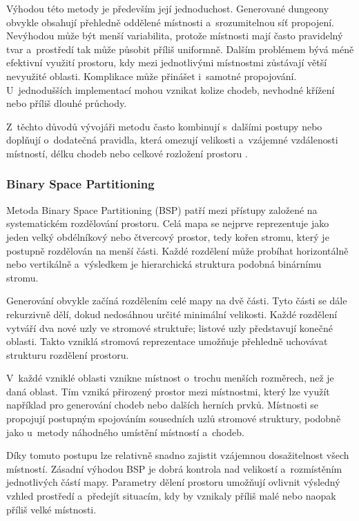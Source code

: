 \documentclass[
   program=itk,
   biblatex,
   figures=true,
   tables=true,
   glossaries,
   index
]{kidiplom}
\begin{document}
Výhodou této metody je především její jednoduchost. Generované dungeony obvykle obsahují přehledně oddělené místnosti a~srozumitelnou síť propojení. Nevýhodou může být menší variabilita, protože místnosti mají často pravidelný tvar a~prostředí tak může působit příliš uniformně. Dalším problémem bývá méně efektivní využití prostoru, kdy mezi jednotlivými místnostmi zůstávají větší nevyužité oblasti. Komplikace může přinášet i~samotné propojování. U~jednodušších implementací mohou vznikat kolize chodeb, nevhodné křížení nebo příliš dlouhé průchody.

Z~těchto důvodů vývojáři metodu často kombinují s~dalšími postupy nebo doplňují o~dodatečná pravidla, která omezují velikosti a~vzájemné vzdálenosti místností, délku chodeb nebo celkové rozložení prostoru \cite{Linden2014,Shaker2016}.

\subsubsection{Binary Space Partitioning}

Metoda Binary Space Partitioning (BSP) patří mezi přístupy založené na systematickém rozdělování prostoru. Celá mapa se nejprve reprezentuje jako jeden velký obdélníkový nebo čtvercový prostor, tedy kořen stromu, který je postupně rozdělován na menší části. Každé rozdělení může probíhat horizontálně nebo vertikálně a~výsledkem je hierarchická struktura podobná binárnímu stromu.

Generování obvykle začíná rozdělením celé mapy na dvě části. Tyto části se dále rekurzivně dělí, dokud nedosáhnou určité minimální velikosti. Každé rozdělení vytváří dva nové uzly ve stromové struktuře; listové uzly představují konečné oblasti. Takto vzniklá stromová reprezentace umožňuje přehledně uchovávat strukturu rozdělení prostoru.

V~každé vzniklé oblasti vznikne místnost o~trochu menších rozměrech, než je daná oblast. Tím vzniká přirozený prostor mezi místnostmi, který lze využít například pro generování chodeb nebo dalších herních prvků. Místnosti se propojují postupným spojováním sousedních uzlů stromové struktury, podobně jako u~metody náhodného umístění místností a~chodeb.

Díky tomuto postupu lze relativně snadno zajistit vzájemnou dosažitelnost všech místností. Zásadní výhodou BSP je dobrá kontrola nad velikostí a~rozmístěním jednotlivých částí mapy. Parametry dělení prostoru umožňují ovlivnit výsledný vzhled prostředí a~předejít situacím, kdy by vznikaly příliš malé nebo naopak příliš velké místnosti.
\end{document}
